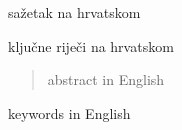 \documentclass[diplomskirad]{fer}
\begin{document}
    
    \begin{sazetak}
        sažetak na hrvatskom
    \end{sazetak}
    \begin{kljucnerijeci}
        ključne riječi na hrvatskom
    \end{kljucnerijeci}
    \begin{abstract}
        abstract in English
    \end{abstract}
    \begin{keywords}
        keywords in English
    \end{keywords}
\end{document}

